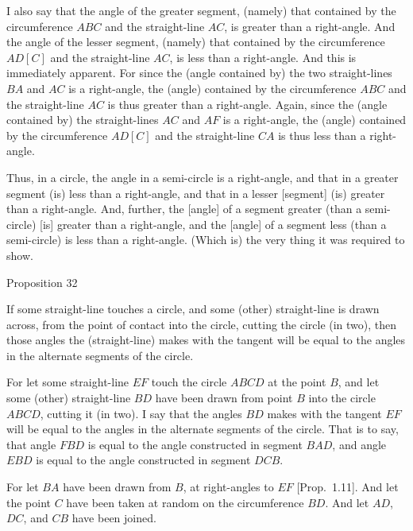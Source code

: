 I also say that the angle of the greater segment, (namely) that contained by
the circumference $ABC$ and the straight-line $AC$, is greater than a right-angle.
And the angle of the lesser segment, (namely) that contained by the circumference
$AD[C]$ and the straight-line $AC$, is less than a right-angle. And
this is immediately apparent. For since the (angle contained by) the
two straight-lines $BA$ and $AC$ is a right-angle, the (angle) contained
by the circumference $ABC$ and the straight-line $AC$ is thus greater than a right-angle. Again, since the (angle contained by) the straight-lines
$AC$ and $AF$ is a right-angle, the (angle) contained by the circumference
$AD[C]$ and the straight-line $CA$ is thus less than a right-angle.

Thus, in a circle, the angle in a semi-circle is a right-angle, and that in a
greater segment (is) less than a right-angle, and that in a
lesser [segment] (is) greater than a right-angle. And, further, the [angle] of
a segment greater (than a semi-circle) [is] greater than a right-angle, and
the [angle] of a segment less (than a semi-circle) is  less than a right-angle.
(Which is) the very thing it was required to show.


\begin{center}
{\large Proposition 32}
\end{center}

If some straight-line touches a circle, and some (other) straight-line is drawn  
across, from the point of contact into the circle,  cutting the circle (in two), then those angles  the (straight-line) makes
with the tangent will be equal to the angles in
the alternate segments of the circle.

\epsfysize=2.1in
\centerline{}

For let some straight-line $EF$ touch the circle $ABCD$ at the point $B$, and let
some (other) straight-line $BD$ have been drawn from point $B$ into the
circle $ABCD$, cutting it (in two). I say that the angles $BD$ makes with the tangent 
$EF$  will be equal to the angles in the alternate segments of the circle.
That is to say, that angle $FBD$ is equal to the angle constructed
in segment $BAD$, and angle $EBD$ is equal to the angle constructed in segment $DCB$.

For let $BA$ have been drawn from $B$, at right-angles to $EF$ [Prop.~1.11].
And let the point $C$ have been taken at random on the circumference $BD$. And
let $AD$, $DC$, and $CB$ have been joined.

